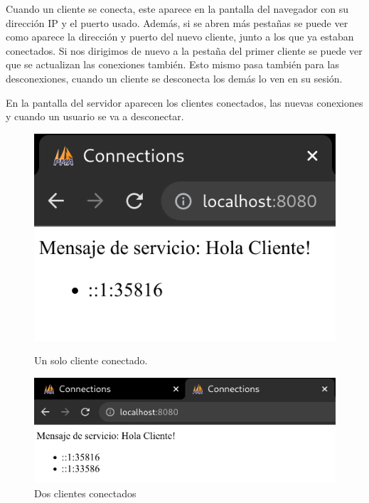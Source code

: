 \documentclass{article}
\begin{document}
Cuando un cliente se conecta, este aparece en la pantalla del navegador con su dirección IP y el puerto usado. Además, si se abren más pestañas se puede ver como aparece la dirección y puerto del nuevo cliente, junto a los que ya estaban conectados. Si nos dirigimos de nuevo a la pestaña del primer cliente se puede ver que se actualizan las conexiones también. Esto mismo pasa también para las desconexiones, cuando un cliente se desconecta los demás lo ven en su sesión.

En la pantalla del servidor aparecen los clientes conectados, las nuevas conexiones y cuando un usuario se va a desconectar.

\begin{figure}[H]
    \centering
    \begin{minipage}[H]{0.49\textwidth}
        \centering
        \includegraphics[width=\textwidth]{images/connect1.png}
        \caption{Un solo cliente conectado.}
    \end{minipage}
    \hfill
    \begin{minipage}[H]{0.49\textwidth}
        \centering
        \includegraphics[width=\textwidth]{images/connect2.png}
        \caption{Dos clientes conectados}
    \end{minipage}
\end{figure}
\end{document}

